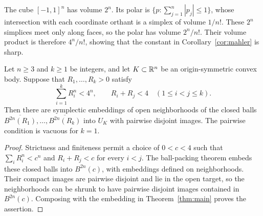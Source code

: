 \begin{remark}[Sharpness]
The cube $[-1,1]^n$ has volume $2^n$. Its polar is
$\{p:\sum_{j=1}^n|p_j|\le1\}$, whose intersection with each coordinate
orthant is a simplex of volume $1/n!$. These $2^n$ simplices meet only
along faces, so the polar has volume $2^n/n!$. Their volume product is
therefore $4^n/n!$, showing that the constant in
Corollary~\ref{cor:mahler} is sharp.
\end{remark}

\begin{corollary}
\label{cor:polar-packings}
Let $n\ge3$ and $k\ge1$ be integers, and let $K\subset\mathbb R^n$ be an
origin-symmetric convex body. Suppose that $R_1,\ldots,R_k>0$ satisfy
\[
 \sum_{i=1}^k R_i^n<4^n,
 \qquad R_i+R_j<4\quad(1\le i<j\le k).
\]
Then there are symplectic embeddings of open neighborhoods of the closed
balls $\overline{B^{2n}(R_1)},\ldots,\overline{B^{2n}(R_k)}$ into $U_K$
with pairwise disjoint images. The pairwise condition is vacuous for $k=1$.
\end{corollary}

\begin{proof}
Strictness and finiteness permit a choice of $0<c<4$ such that
$\sum_i R_i^n<c^n$ and $R_i+R_j<c$ for every $i<j$.
The ball-packing theorem \cite[Theorem~1.1]{OpenAIBallPackings2026}
embeds these closed balls into $B^{2n}(c)$, with embeddings defined on
neighborhoods. Their compact images are pairwise disjoint and lie in the
open target, so the neighborhoods can be shrunk to have pairwise disjoint
images contained in $B^{2n}(c)$. Composing with the embedding in
Theorem~\ref{thm:main} proves the assertion.
\end{proof}
